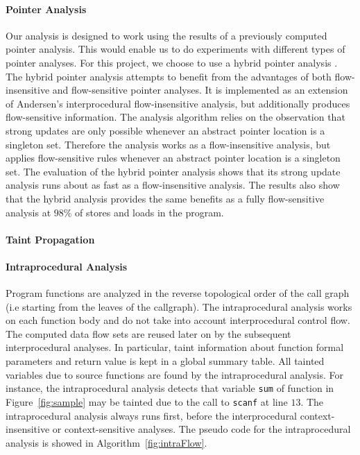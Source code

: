 \paragraph{Pointer Analysis}
Our analysis is designed to work using the results of
a previously computed pointer analysis. This would enable us to
do experiments with different types of pointer
analyses. For this project, we choose to use a hybrid
pointer analysis \cite{Lhotak:2011:PAE}. The hybrid
pointer analysis attempts to benefit from the
advantages of both flow-insensitive and flow-sensitive 
pointer analyses. It is implemented as an extension of
Andersen's interprocedural flow-insensitive analysis, but
additionally produces flow-sensitive information. The analysis
algorithm relies on the observation that strong updates
are only possible whenever an abstract pointer location is
a singleton set. Therefore the analysis works as a
flow-insensitive analysis, but applies flow-sensitive
rules whenever an abstract pointer location is a singleton set.
The evaluation of the hybrid pointer analysis shows that its
strong update analysis runs about as fast as a flow-insensitive analysis.
The results also show that the hybrid
analysis provides the same benefits as a fully flow-sensitive
analysis at $98\%$ of stores and loads in the program.

\paragraph{Taint Propagation}

\paragraph{Intraprocedural Analysis}
Program functions are analyzed in the reverse
topological order of the call graph (i.e starting
from the leaves of the callgraph).
The intraprocedural analysis works on each function
body and do not take into account interprocedural
control flow. The computed data flow sets are reused
later on by the subsequent interprocedural analyses.
In particular, taint information about function
formal parameters and return value is kept in a
global summary table.
All tainted variables due to source functions are
found by the intraprocedural analysis. 
For instance, the intraprocedural analysis detects
that variable \texttt{sum} of function \compute{}
in Figure~\ref{fig:sample} may be tainted due to the
call to \texttt{scanf} at line $13$.
The intraprocedural analysis always runs
first, before the interprocedural context-insensitive
or context-sensitive analyses.
The pseudo code for the intraprocedural analysis
is showed in Algorithm~\ref{fig:intraFlow}.

